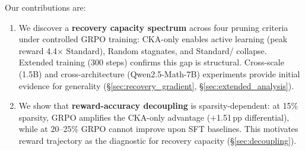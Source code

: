 Our contributions are:
\begin{enumerate}[nosep,leftmargin=*]
    \item We discover a \textbf{recovery capacity spectrum} across four pruning criteria under controlled GRPO training: CKA-only enables active learning (peak reward 4.4$\times$ Standard), Random stagnates, and Standard/\rasp{} collapse. Extended training (300 steps) confirms this gap is structural. Cross-scale (1.5B) and cross-architecture (Qwen2.5-Math-7B) experiments provide initial evidence for generality (\S\ref{sec:recovery_gradient}, \S\ref{sec:extended_analysis}).
    \item We show that \textbf{reward-accuracy decoupling} is sparsity-dependent: at 15\% sparsity, GRPO amplifies the CKA-only advantage ($+$1.51\,pp differential), while at 20--25\% GRPO cannot improve upon SFT baselines. This motivates reward trajectory as the diagnostic for recovery capacity (\S\ref{sec:decoupling}).
\end{enumerate}
